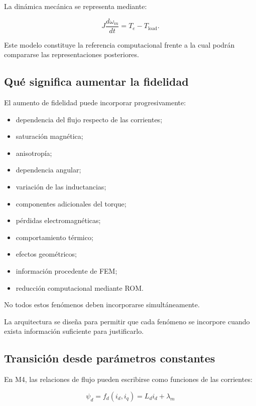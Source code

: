 La dinámica mecánica se representa mediante:

\begin{equation}
J\frac{d\omega_m}{dt} = T_e-T_{\mathrm{load}}.
\end{equation}

Este modelo constituye la referencia computacional frente a la cual podrán compararse las representaciones posteriores.

\subsection{Qué significa aumentar la fidelidad}

El aumento de fidelidad puede incorporar progresivamente:

\begin{itemize}
\item dependencia del flujo respecto de las corrientes;
\item saturación magnética;
\item anisotropía;
\item dependencia angular;
\item variación de las inductancias;
\item componentes adicionales del torque;
\item pérdidas electromagnéticas;
\item comportamiento térmico;
\item efectos geométricos;
\item información procedente de FEM;
\item reducción computacional mediante ROM.
\end{itemize}

No todos estos fenómenos deben incorporarse simultáneamente.

La arquitectura se diseña para permitir que cada fenómeno se incorpore cuando exista información suficiente para justificarlo.

\subsection{Transición desde parámetros constantes}

En M4, las relaciones de flujo pueden escribirse como funciones de las corrientes:

\begin{equation}
\psi_d=f_d(i_d,i_q)
=
L_di_d+\lambda_m
\end{equation}

